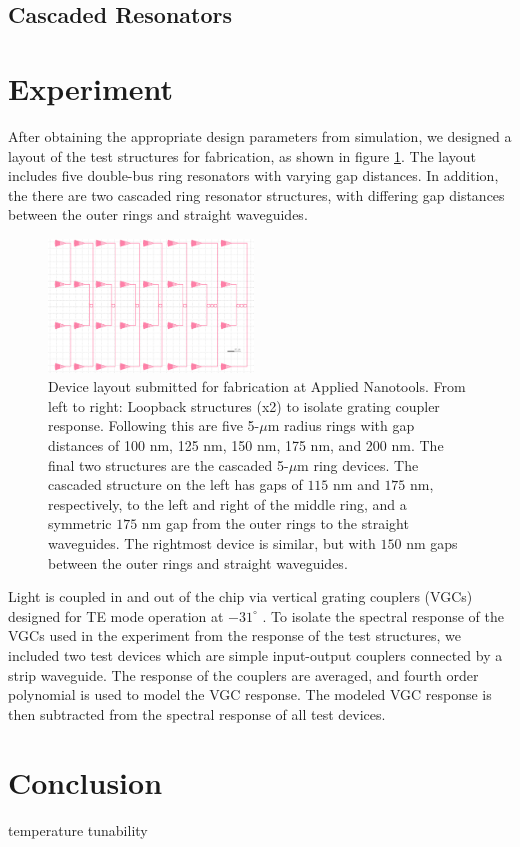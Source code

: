 \documentclass[letterpaper, 10 pt, conference]{ieeeconf}
\begin{document}
\subsection*{Cascaded Resonators}

\section{Experiment}

After obtaining the appropriate design parameters from simulation, we designed a layout of the test structures for fabrication, as shown in figure \ref{fig:layout}. The layout includes five double-bus ring resonators with varying gap distances. In addition, the there are two cascaded ring resonator structures, with differing gap distances between the outer rings and straight waveguides. 

\begin{figure}[!ht]
    \centering
    \includegraphics[width = 0.485\textwidth]{layout.png}
    \caption{Device layout submitted for fabrication at Applied Nanotools. From left to right: Loopback structures (x2) to isolate grating coupler response. Following this are five 5-$\mu$m radius rings with gap distances of 100 nm, 125 nm, 150 nm, 175 nm, and 200 nm. The final two structures are the cascaded 5-$\mu$m ring devices. The cascaded structure on the left has gaps of $115$ nm and $175$ nm, respectively, to the left and right of the middle ring, and a symmetric $175$ nm gap from the outer rings to the straight waveguides. The rightmost device is similar, but with $150$ nm gaps between the outer rings and straight waveguides.}
    \label{fig:layout}
\end{figure} 

Light is coupled in and out of the chip via vertical grating couplers (VGCs) designed for TE mode operation at $-31^\circ$ \cite{VGC}. To isolate the spectral response of the VGCs used in the experiment from the response of the test structures, we included two test devices which are simple input-output couplers connected by a strip waveguide. The response of the couplers are averaged, and fourth order polynomial is used to model the VGC response. The modeled VGC response is then subtracted from the spectral response of all test devices. 


\section{Conclusion}

temperature tunability







\end{document}
